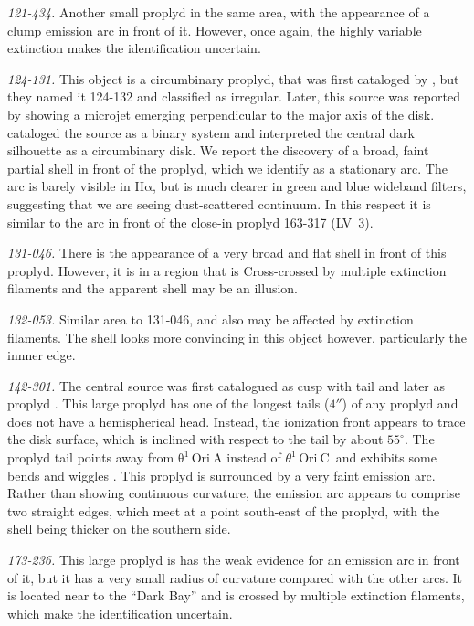 \documentclass[apj, twocolumn]{aastex63}
\newcommand\ha{\ensuremath{\mathrm{H\alpha}}}
\newcommand\thC{\ensuremath{\theta^1\,\mathrm{Ori~C}}}
\begin{document}
\textit{121-434.}  Another small proplyd in the same area, with the
appearance of a clump emission arc in front of it.  However, once
again, the highly variable extinction makes the identification
uncertain.

\textit{124-131.} This object is a circumbinary proplyd, that was
first cataloged by \citet{ODell:1996a}, but they named it 124-132 and
classified as irregular. Later, this source was reported by
\citet{Smith:2005a} showing a microjet emerging perpendicular to the
major axis of the disk. \citet{Ricci:2008a} cataloged the source as a
binary system and \citet{Robberto:2008a} interpreted the central dark
silhouette as a circumbinary disk.  We report the discovery of a
broad, faint partial shell in front of the proplyd, which we identify
as a stationary arc.  The arc is barely visible in \ha{}, but is much
clearer in green and blue wideband filters, suggesting that we are
seeing dust-scattered continuum.  In this respect it is similar to the
arc in front of the close-in proplyd 163-317 (LV~3).

\textit{131-046.}  There is the appearance of a very broad and flat
shell in front of this proplyd.  However, it is in a region that is
Cross-crossed by multiple extinction filaments and the apparent shell
may be an illusion.

\textit{132-053.}  Similar area to 131-046, and also may be affected
by extinction filaments. The shell looks more convincing in this
object however, particularly the innner edge.

\textit{142-301.} The central source was first catalogued as
cusp with tail \citep{ODell:1996a} and later as proplyd
\citep{Bally:2000a, Ricci:2008a}. This large proplyd has
one of the longest tails (\(4''\)) of any proplyd and does
not have a hemispherical head. Instead, the ionization front
appears to trace the disk surface, which is inclined with
respect to the tail by about $55^{\circ}$. The proplyd tail
points away from \(\mathrm{\theta^1\,Ori~A}\) instead of \thC~and
exhibits some bends and wiggles \citep{Bally:2000a}. This proplyd
is surrounded by a very faint emission arc.  Rather than showing
continuous curvature, the emission arc appears to comprise two
straight edges, which meet at a point south-east of the proplyd,
with the shell being thicker on the southern side.

\textit{173-236.} This large proplyd is has the weak evidence for an
emission arc in front of it, but it has a very small radius of
curvature compared with the other arcs.  It is located near to the
``Dark Bay'' \citep{ODell:2000a} and is crossed by multiple extinction
filaments, which make the identification uncertain.
\end{document}
